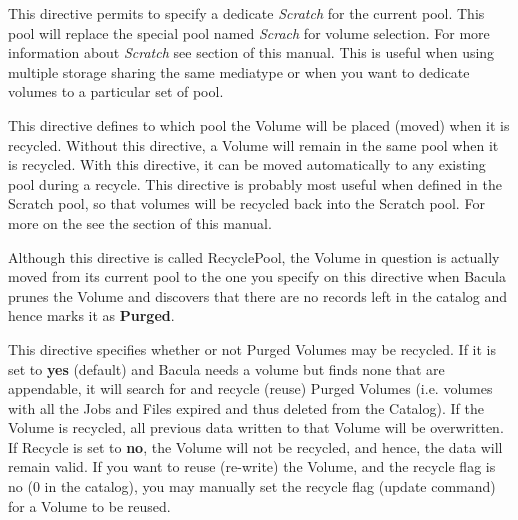 \begin{description}
\label{PoolScratchPool}
\item [ScratchPool = \lt{}pool-resource-name\gt{}]
   This directive permits to specify a dedicate \textsl{Scratch} for the
   current pool. This pool will replace the special pool named \textsl{Scrach}
   for volume selection. For more information about \textsl{Scratch} see
    section of this manual. This is useful
   when using multiple storage sharing the same mediatype or when you want to
   dedicate volumes to a particular set of pool.

\label{PoolRecyclePool}
\item [RecyclePool = \lt{}pool-resource-name\gt{}]
   This directive defines to which pool
   the Volume will be placed (moved) when it is recycled. Without
   this directive, a Volume will remain in the same pool when it is
   recycled. With this directive, it can be moved automatically to any
   existing pool during a recycle. This directive is probably most
   useful when defined in the Scratch pool, so that volumes will
   be recycled back into the Scratch pool. For more on the see the   
    section of this manual.

   Although this directive is called RecyclePool, the Volume in
   question is actually moved from its current pool to the one
   you specify on this directive when Bacula prunes the Volume and
   discovers that there are no records left in the catalog and hence
   marks it as {\bf Purged}.
        
   
\label{PoolRecycle}
\item [Recycle = \lt{}yes\vb{}no\gt{}]
   This directive specifies whether or not Purged Volumes may be recycled.
   If it is set to {\bf yes} (default) and Bacula needs a volume but finds
   none that are appendable, it will search for and recycle (reuse) Purged
   Volumes (i.e.  volumes with all the Jobs and Files expired and thus
   deleted from the Catalog).  If the Volume is recycled, all previous data
   written to that Volume will be overwritten. If Recycle is set to {\bf
   no}, the Volume will not be recycled, and hence, the data will remain
   valid.  If you want to reuse (re-write) the Volume, and the recycle flag
   is no (0 in the catalog), you may manually set the recycle flag (update
   command) for a Volume to be reused.


\end{description}
